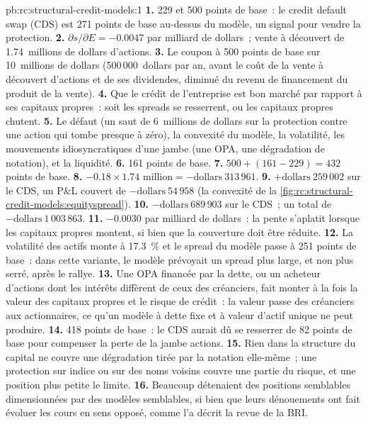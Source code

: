 \begin{solution}{pb:rc:structural-credit-models:1}
\textbf{1.} 229 et 500 points de base~: le credit default swap (CDS) est 271 points de base au-dessus du
modèle, un signal pour vendre la protection.
\textbf{2.} $\partial s/\partial E = -0.0047$ par milliard de dollars~; vente à découvert de 1.74~millions
de dollars d'actions.
\textbf{3.} Le coupon à 500 points de base sur 10~millions de dollars (500\,000~dollars par an, avant le
coût de la vente à découvert d'actions et de ses dividendes, diminué du revenu de financement du produit de la vente).
\textbf{4.} Que le crédit de l'entreprise est bon marché par rapport à ses capitaux propres~: soit les spreads se resserrent,
ou les capitaux propres chutent.
\textbf{5.} Le défaut (un saut de 6~millions de dollars sur la protection contre une action
qui tombe presque à zéro), la convexité du modèle, la volatilité, les mouvements idiosyncratiques d'une
jambe (une OPA, une dégradation de notation), et la liquidité.
\textbf{6.} 161 points de base.
\textbf{7.} $500+(161-229) = 432$ points de base.
\textbf{8.} $-0.18\times1.74 \text{ million} = -\text{dollars}~313\,961$.
\textbf{9.} $+\text{dollars}~259\,002$ sur le CDS, un P\&L couvert de $-\text{dollars}~54\,958$
(la convexité de la \cref{fig:rc:structural-credit-models:equityspread}).
\textbf{10.} $-\text{dollars}~689\,903$ sur le CDS~; un total de $-\text{dollars}~1\,003\,863$.
\textbf{11.} $-0.0030$ par milliard de dollars~: la pente s'aplatit lorsque les capitaux propres montent, si bien que la couverture
doit être réduite.
\textbf{12.} La volatilité des actifs monte à 17.3~\% et le spread du modèle passe à 251 points
de base~: dans cette variante, le modèle prévoyait un spread plus large, et non plus serré, après le rallye.
\textbf{13.} Une OPA financée par la dette, ou un acheteur d'actions dont les intérêts diffèrent
de ceux des créanciers, fait monter à la fois la valeur des capitaux propres et le risque de crédit~: la valeur passe des
créanciers aux actionnaires, ce qu'un modèle à dette fixe et à valeur d'actif unique ne peut
produire.
\textbf{14.} 418 points de base~: le CDS aurait dû se resserrer de 82 points
de base pour compenser la perte de la jambe actions.
\textbf{15.} Rien dans la structure du capital ne couvre une dégradation tirée par la notation
elle-même~; une protection sur indice ou sur des noms voisins couvre une partie du risque, et une
position plus petite le limite.
\textbf{16.} Beaucoup détenaient des positions semblables dimensionnées par des modèles semblables, si bien que leurs dénouements
ont fait évoluer les cours en sens opposé, comme l'a décrit la revue de la BRI.

\end{solution}
